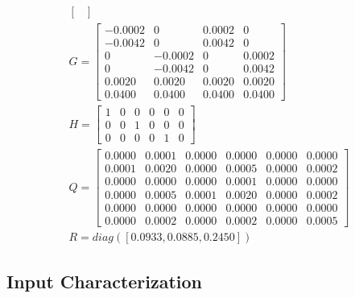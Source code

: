 \documentclass[12pt]{extarticle}
\begin{document}
{\begin{equation}
\begin{split}
\begin{bmatrix}
         \end{bmatrix}
         \\
         G=\begin{bmatrix}
            -0.0002     &    0   & 0.0002     &    0\\
              -0.0042  &       0  &  0.0042   &    0\\
             0  & -0.0002        & 0&    0.0002\\
             0  & -0.0042        & 0 &   0.0042\\
            0.0020   & 0.0020    &0.0020  &  0.0020\\
            0.0400   & 0.0400    &0.0400  &  0.0400
            \end{bmatrix}
            \\
            H=\begin{bmatrix}
        1&0&0&0&0&0\\
        0&0&1&0&0&0\\
        0&0&0&0&1&0
        \end{bmatrix}
            \\
        Q=\begin{bmatrix}
            0.0000   & 0.0001&    0.0000  &  0.0000&    0.0000  &  0.0000\\
            0.0001   & 0.0020&    0.0000  &  0.0005 &   0.0000  &  0.0002\\
            0.0000   & 0.0000&    0.0000  &  0.0001  &  0.0000  &  0.0000\\
            0.0000   & 0.0005&    0.0001  &  0.0020   & 0.0000  &  0.0002\\
            0.0000   & 0.0000&    0.0000  &  0.0000    &0.0000  &  0.0000\\
            0.0000   & 0.0002&    0.0000  &  0.0002    &0.0000  &  0.0005
        \end{bmatrix}\\
                R=diag([0.0933,0.0885,0.2450])
    \end{split}
    \end{equation}
}

\subsection{Input Characterization}
\end{document}
